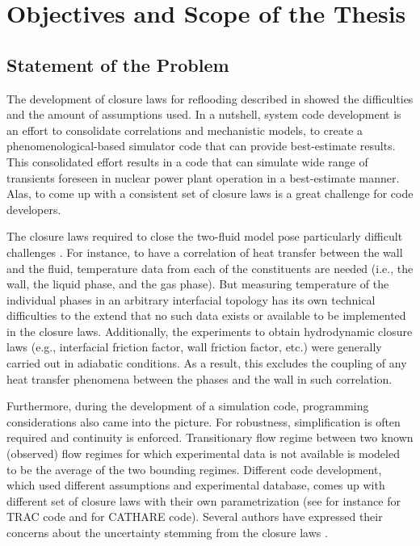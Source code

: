 \section{Objectives and Scope of the Thesis}\label{sec:intro_objectives_and_scope}

\subsection{Statement of the Problem}\label{sub:intro_statement_of_problem}

The development of closure laws for reflooding described in \cite{Nelson1992,USNRC2012} showed the difficulties and the amount of assumptions used.
In a nutshell, system code development is an effort to consolidate correlations and mechanistic models, to create a phenomenological-based simulator code that can provide best-estimate results.
This consolidated effort results in a code that can simulate wide range of transients foreseen in nuclear power plant operation in a best-estimate manner.
Alas, to come up with a consistent set of closure laws is a great challenge for code developers.

The closure laws required to close the two-fluid model pose particularly difficult challenges \cite{Wulff2007}.
For instance, to have a correlation of heat transfer between the wall and the fluid, temperature data from each of the constituents are needed (i.e., the wall, the liquid phase, and the gas phase).
But measuring temperature of the individual phases in an arbitrary interfacial topology has its own technical difficulties to the extend that no such data exists or available to be implemented in the closure laws.
Additionally, the experiments to obtain hydrodynamic closure laws (e.g., interfacial friction factor, wall friction factor, etc.) were generally carried out in adiabatic conditions.
As a result, this excludes the coupling of any heat transfer phenomena between the phases and the wall in such correlation.

Furthermore, during the development of a simulation code, programming considerations also came into the picture.
For robustness, simplification is often required and continuity is enforced.
Transitionary flow regime between two known (observed) flow regimes for which experimental data is not available is modeled to be the average of the two bounding regimes.
Different code development, which used different assumptions and experimental database, comes up with different set of closure laws with their own parametrization (see for instance \cite{Nelson1992} for TRAC code and \cite{Bestion1990} for CATHARE code).
Several authors have expressed their concerns about the uncertainty stemming from the closure laws \cite{Wulff2007,Petruzzi2008a,DAuria2012}.

